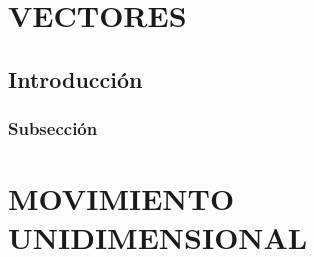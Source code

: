 \documentclass{book}
\begin{document}
\tableofcontents

\chapter{VECTORES}
\section{Introducción}
\subsection{Subsección}
\chapter{MOVIMIENTO UNIDIMENSIONAL}
\end{document}
